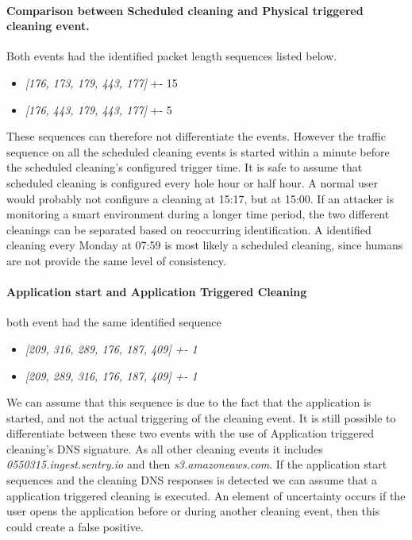 \paragraph{Comparison between Scheduled cleaning and Physical triggered cleaning event.} Both events had the identified packet length sequences listed below. 
\begin{itemize}
    \item \textit{[176, 173, 179, 443, 177]} +- 15
    \item \textit{[176, 443, 179, 443, 177]} +- 5
\end{itemize}
These sequences can therefore not differentiate the events. However the traffic sequence on all the scheduled cleaning events is started within a minute before the scheduled cleaning's configured trigger time. It is safe to assume that scheduled cleaning is configured every hole hour or half hour. A normal user would probably not configure a cleaning at 15:17, but at 15:00. If an attacker is monitoring a smart environment during a longer time period, the two different cleanings can be separated based on reoccurring identification. A identified cleaning every Monday at 07:59 is most likely a scheduled cleaning, since humans are not provide the same level of consistency.


\paragraph{Application start and Application Triggered Cleaning}
both event had the same identified sequence
\begin{itemize}
    \item \textit{[209, 316, 289, 176, 187, 409] +- 1}
    \item \textit{[209, 289, 316, 176, 187, 409] +- 1}
\end{itemize}
We can assume that this sequence is due to the fact that the application is started, and not the actual triggering of the cleaning event. It is still possible to differentiate between these two events with the use of Application triggered cleaning's DNS signature. As all other cleaning events it includes \textit{0550315.ingest.sentry.io} and then \textit{s3.amazoneaws.com}. If the application start sequences and the cleaning DNS responses is detected we can assume that a application triggered cleaning is executed. An element of uncertainty occurs if the user opens the application before or during another cleaning event, then this could create a false positive. 

